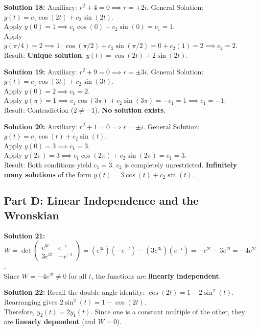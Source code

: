 \documentclass[11pt]{article}
\begin{document}
\textbf{Solution 18:} 
Auxiliary: $r^2 + 4 = 0 \implies r = \pm 2i$. General Solution: $y(t) = c_1\cos(2t) + c_2\sin(2t)$. \\
Apply $y(0) = 1 \implies c_1\cos(0) + c_2\sin(0) = c_1 = 1$. \\
Apply $y(\pi/4) = 2 \implies 1\cdot\cos(\pi/2) + c_2\sin(\pi/2) = 0 + c_2(1) = 2 \implies c_2 = 2$. \\
Result: \textbf{Unique solution}, $y(t) = \cos(2t) + 2\sin(2t)$.

\textbf{Solution 19:} 
Auxiliary: $r^2 + 9 = 0 \implies r = \pm 3i$. General Solution: $y(t) = c_1\cos(3t) + c_2\sin(3t)$. \\
Apply $y(0) = 2 \implies c_1 = 2$. \\
Apply $y(\pi) = 1 \implies c_1\cos(3\pi) + c_2\sin(3\pi) = -c_1 = 1 \implies c_1 = -1$. \\
Result: Contradiction ($2 \neq -1$). \textbf{No solution exists}.

\textbf{Solution 20:} 
Auxiliary: $r^2 + 1 = 0 \implies r = \pm i$. General Solution: $y(t) = c_1\cos(t) + c_2\sin(t)$. \\
Apply $y(0) = 3 \implies c_1 = 3$. \\
Apply $y(2\pi) = 3 \implies c_1\cos(2\pi) + c_2\sin(2\pi) = c_1 = 3$. \\
Result: Both conditions yield $c_1 = 3$. $c_2$ is completely unrestricted. \textbf{Infinitely many solutions} of the form $y(t) = 3\cos(t) + c_2\sin(t)$.

\subsection*{Part D: Linear Independence and the Wronskian}

\textbf{Solution 21:} 
$W = \det \begin{pmatrix} e^{3t} & e^{-t} \\ 3e^{3t} & -e^{-t} \end{pmatrix} = (e^{3t})(-e^{-t}) - (3e^{3t})(e^{-t}) = -e^{2t} - 3e^{2t} = -4e^{2t}$. \\
Since $W = -4e^{2t} \neq 0$ for all $t$, the functions are \textbf{linearly independent}.

\textbf{Solution 22:} 
Recall the double angle identity: $\cos(2t) = 1 - 2\sin^2(t)$. \\
Rearranging gives $2\sin^2(t) = 1 - \cos(2t)$. \\
Therefore, $y_2(t) = 2y_1(t)$. Since one is a constant multiple of the other, they are \textbf{linearly dependent} (and $W = 0$).
\end{document}
